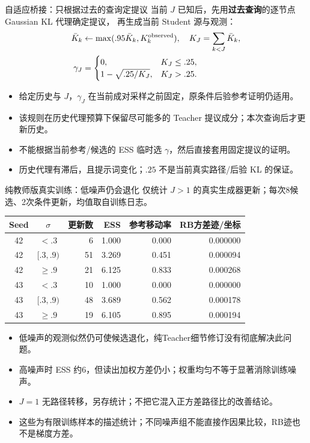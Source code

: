 \documentclass[10pt,aspectratio=169]{beamer}
\begin{document}
\begin{frame}{自适应桥接：只根据过去的查询定提议}
\small
当前 $J$ 已知后，先用\textbf{过去查询}的逐节点 Gaussian KL 代理确定提议，
再生成当前 Student 源与观测：
\begin{align}
\bar K_k&\leftarrow\max(.95\bar K_k,K_k^{\rm observed}),\quad
K_J=\sum_{k<J}\bar K_k,\\
\gamma_J&=\begin{cases}0,&K_J\leq .25,\\1-\sqrt{.25/K_J},&K_J>.25.\end{cases}
\end{align}
\begin{itemize}\itemsep5pt
\item 给定历史与 $J$，$\gamma_J$ 在当前成对采样之前固定，原条件后验参考证明仍适用。
\item 该规则在历史代理预算下保留尽可能多的 Teacher 提议成分；本次查询后才更新历史。
\item 不能根据当前参考/候选的 ESS 临时选 $\gamma$，然后直接套用固定提议的证明。
\item 历史代理有滞后，且提示词变化；$.25$ 不是当前真实路径/后验 KL 的保证。
\end{itemize}
\end{frame}
\begin{frame}{纯教师版真实训练：低噪声仍会退化}
\scriptsize\centering
仅统计 $J>1$ 的真实生成器更新；每次8候选、2次条件更新，均值取自训练日志。
\begin{tabular}{ccrrrr}\toprule
Seed & $\sigma$ & 更新数 & ESS & 参考移动率 & RB方差迹/坐标\\\midrule
42 & $<.3$ & 6 & 1.000 & 0.000 & 0.000000 \\
42 & $[.3,.9)$ & 51 & 3.269 & 0.451 & 0.000094 \\
42 & $\geq.9$ & 21 & 6.125 & 0.833 & 0.000268 \\
43 & $<.3$ & 10 & 1.000 & 0.000 & 0.000000 \\
43 & $[.3,.9)$ & 48 & 3.689 & 0.562 & 0.000178 \\
43 & $\geq.9$ & 19 & 6.105 & 0.895 & 0.000194 \\
\bottomrule\end{tabular}\par\raggedright\vspace{6pt}
\begin{itemize}\itemsep4pt
\item 低噪声的观测似然仍可使候选退化，纯Teacher细节修订没有彻底解决此问题。
\item 高噪声时 ESS 约6，但读出加权方差仍小；权重均匀不等于显著消除训练噪声。
\item $J=1$ 无路径转移，另存统计；不把它混入正方差路径比的改善结论。
\item 这些为有限训练样本的描述统计；不同噪声组不能直接作因果比较，RB迹也不是梯度方差。
\end{itemize}
\end{frame}
\end{document}
